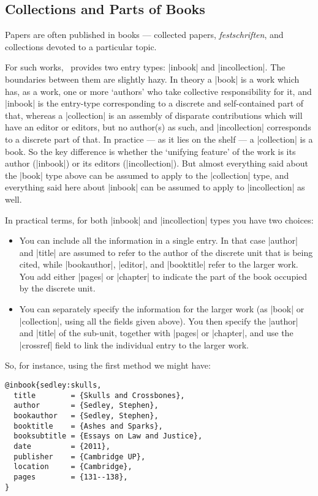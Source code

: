 {\subsection{Collections and Parts of Books}

Papers are often published in books --- collected papers,
\emph{festschriften}, and collections devoted to a particular topic.

For such works, \biblatex\ provides two entry types: |inbook| and
|incollection|.\label{inbook:vs:incollection} The boundaries between
them are slightly hazy. In theory a |book| is a work which has, as a
work, one or more `authors' who take collective responsibility for it,
and |inbook| is the entry-type corresponding to a discrete and
self-contained part of that, whereas a |collection| is an assembly of
disparate contributions which will have an editor or editors, but no
author(s) as such, and |incollection| corresponds to a discrete part
of that. In practice --- as it lies on the shelf --- a |collection| is
a book. So the key difference is whether the `unifying feature' of the
work is its author (|inbook|) or its editors (|incollection|). But
almost everything said about the |book| type above can be assumed to
apply to the |collection| type, and everything said here about
|inbook| can be assumed to apply to |incollection| as well.

In practical terms, for both |inbook| and |incollection| types you
have two choices:
\begin{itemize}
\item You can include all the information in a single entry. In that
  case |author| and |title| are assumed to refer to the author of the
  discrete unit that is being cited, while |bookauthor|, |editor|, and
  |booktitle| refer to the larger work. You add either |pages| or
  |chapter| to indicate the part of the book occupied by the discrete
  unit.
\item You can separately specify the information for the larger work
  (as |book| or |collection|, using all the fields given above). You
  then specify the |author| and |title| of the sub-unit, together with
  |pages| or |chapter|, and use the |crossref| field to link the
  individual entry to the larger work.
\end{itemize}

So, for instance, using the first method we might have:
\begin{Verbatim}
@inbook{sedley:skulls,
  title        = {Skulls and Crossbones},
  author       = {Sedley, Stephen},
  bookauthor   = {Sedley, Stephen},
  booktitle    = {Ashes and Sparks},
  booksubtitle = {Essays on Law and Justice},
  date         = {2011},
  publisher    = {Cambridge UP},
  location     = {Cambridge},
  pages        = {131--138},
}
\end{Verbatim}

}
